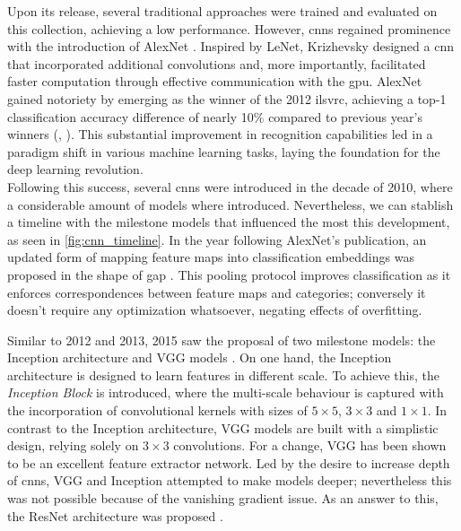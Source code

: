 Upon its release, several traditional approaches were trained and evaluated on this collection, 
achieving a low performance. However, \glspl{cnn} regained prominence with the introduction of
AlexNet \autocite{krizhevsky2012imagenet}. Inspired by LeNet, Krizhevsky designed a 
\gls{cnn} that incorporated additional convolutions and, more importantly, facilitated faster 
computation through effective communication with the \gls{gpu}.
AlexNet gained notoriety by emerging as the winner of the 2012 \gls{ilsvrc}, achieving a top-1 
classification accuracy difference of nearly 10\% compared to previous year's winners 
(\cite{berg2010large}, \cite{sanchez2011high}). This substantial improvement in recognition 
capabilities led in a paradigm shift in various machine learning tasks, laying the foundation 
for the deep learning revolution.\\

\noindent Following this success, several \glspl{cnn} were introduced in the decade of 2010, where 
a considerable amount of models where introduced. Nevertheless, we can stablish a timeline with the 
milestone models that influenced the most this development, as seen in \autoref{fig:cnn_timeline}.
In the year following AlexNet's publication, an updated form of mapping feature maps into 
classification embeddings was proposed  in the shape of \gls{gap} \autocite{lin2013network}. 
This pooling protocol improves classification as it enforces correspondences between feature maps 
and categories; conversely it doesn't require any optimization whatsoever, negating effects of 
overfitting. 

Similar to 2012 and 2013, 2015 saw the proposal of two milestone models: the Inception architecture 
\autocite{szegedy2015going} and VGG models \autocite{simonyan2015deep}. On one hand, the Inception 
architecture is designed to learn features in different scale. To achieve this, the \emph{Inception 
Block} is introduced, where the multi-scale behaviour is captured with the incorporation of 
convolutional kernels with sizes of $5\times5$, $3\times 3$ and $1\times1$. In contrast to 
the Inception architecture, VGG models are built with a simplistic design, relying solely on 
$3\times 3$ convolutions. For a change, VGG has been shown to be an excellent feature extractor network. 
Led by the desire to increase depth of \glspl{cnn}, VGG and Inception attempted to make models 
deeper; nevertheless this was not possible because of the vanishing gradient issue. As an answer to 
this, the ResNet architecture was proposed \autocite{he2016deep}.\\

